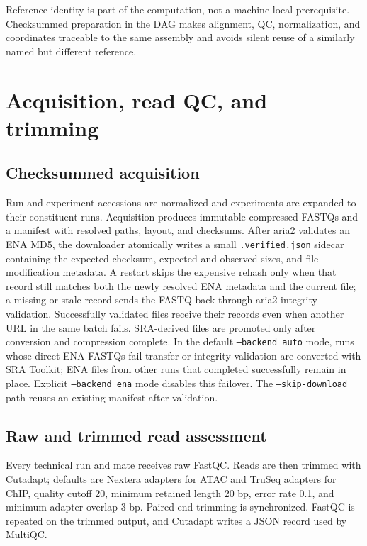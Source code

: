 \documentclass[11pt]{article}
\newcommand{\software}[1]{\textsf{#1}}
\begin{document}
Reference identity is part of the computation, not a machine-local
prerequisite.  Checksummed preparation in the DAG makes alignment, QC,
normalization, and coordinates traceable to the same assembly and avoids
silent reuse of a similarly named but different reference.

\section{Acquisition, read QC, and trimming}

\subsection{Checksummed acquisition}

Run and experiment accessions are normalized and experiments are expanded to
their constituent runs.  Acquisition produces immutable compressed FASTQs and
a manifest with resolved paths, layout, and checksums.  After \software{aria2}
validates an ENA MD5, the downloader atomically writes a small
\texttt{.verified.json} sidecar containing the expected checksum, expected and
observed sizes, and file modification metadata.  A restart skips the expensive
rehash only when that record still matches both the newly resolved ENA
metadata and the current file; a missing or stale record sends the FASTQ back
through \software{aria2} integrity validation.  Successfully validated files
receive their records even when another URL in the same batch fails.
SRA-derived files are promoted only after conversion and compression complete.
In the default \texttt{--backend auto} mode, runs whose direct ENA FASTQs fail
transfer or integrity validation are converted with SRA Toolkit; ENA files
from other runs that completed successfully remain in place.  Explicit
\texttt{--backend ena} mode disables this failover.  The
\texttt{--skip-download} path reuses an existing manifest after validation.

\subsection{Raw and trimmed read assessment}

Every technical run and mate receives raw \software{FastQC}.  Reads are then
trimmed with \software{Cutadapt}; defaults are Nextera adapters for ATAC and
TruSeq adapters for ChIP, quality cutoff 20, minimum retained length 20 bp,
error rate 0.1, and minimum adapter overlap 3 bp.  Paired-end trimming is
synchronized.  FastQC is repeated on the trimmed output, and Cutadapt writes a
JSON record used by MultiQC.
\end{document}
